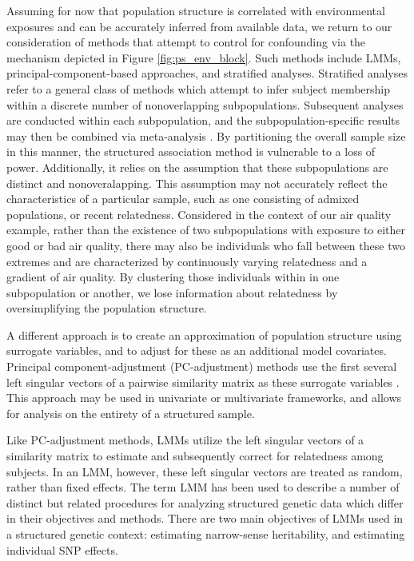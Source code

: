 Assuming for now that population structure is correlated with environmental exposures and can be accurately inferred from available data, we return to our consideration of methods that attempt to control for confounding via the mechanism depicted in Figure \ref{fig:ps_env_block}. Such methods include LMMs, principal-component-based approaches, and stratified analyses. Stratified analyses refer to a general class of methods which attempt to infer subject membership within a discrete number of nonoverlapping subpopulations. Subsequent analyses are conducted within each subpopulation, and the subpopulation-specific results may then be combined via meta-analysis \citep{pritchard1999use, pritchard2000association}. By partitioning the overall sample size in this manner, the structured association method is vulnerable to a loss of power. Additionally, it relies on the assumption that these subpopulations are distinct and nonoveralapping. This assumption may not accurately reflect the characteristics of a particular sample, such as one consisting of admixed populations, or recent relatedness. Considered in the context of our air quality example, rather than the existence of two subpopulations with exposure to either good or bad air quality, there may also be individuals who fall between these two extremes and are characterized by continuously varying relatedness and a gradient of air quality. By clustering those individuals within in one subpopulation or another, we lose information about relatedness by oversimplifying the population structure.

A different approach is to create an approximation of population structure using surrogate variables, and to adjust for these as an additional model covariates. Principal component-adjustment (PC-adjustment) methods use the first several left singular vectors of a pairwise similarity matrix as these surrogate variables \citep{price2006principal}. This approach may be used in univariate or multivariate frameworks, and allows for analysis on the entirety of a structured sample. 

Like PC-adjustment methods, LMMs utilize the left singular vectors of a similarity matrix to estimate and subsequently correct for relatedness among subjects. In an LMM, however, these left singular vectors are treated as random, rather than fixed effects. The term LMM has been used to describe a number of distinct but related procedures for analyzing structured genetic data which differ in their objectives and methods. There are two main objectives of LMMs used in a structured genetic context: estimating narrow-sense heritability, and estimating individual SNP effects.

